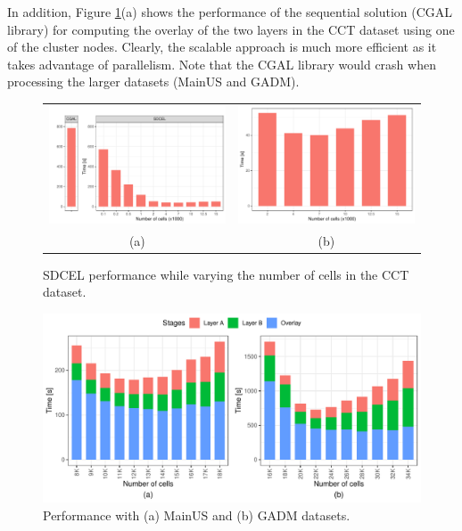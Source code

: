 In addition, Figure \ref{fig:ca}(a) shows the performance of the sequential solution (CGAL library) for computing the overlay of the two layers in the CCT dataset using one of the cluster nodes. Clearly, the scalable approach is much more efficient as it takes advantage of parallelism. Note that the CGAL library would crash when processing the larger datasets (MainUS and GADM).

\begin{figure}
    \centering
    \begin{tabular}{cc}
        \includegraphics[width=0.50\linewidth]{chapterSDCEL/CA/CA} & 
        \includegraphics[width=0.45\linewidth]{chapterSDCEL/CA/CA_sample} \\
        (a) & (b)
    \end{tabular}
    \caption{SDCEL performance while varying the number of cells in the CCT dataset.} \label{fig:ca}
\end{figure}

\begin{figure}
    \centering
    \includegraphics[width=\textwidth]{chapterSDCEL/Performance/Performance} 
    \caption{Performance with (a) MainUS and (b) GADM datasets.} \label{fig:mainus}
\end{figure}

